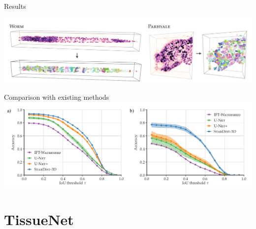 \documentclass[9pt, aspectratio=169]{beamer}
\begin{document}
\begin{frame}
    {Results}
    \centering

    \includegraphics[width=\textwidth]{Weigert2020_results.png}
\end{frame}

\begin{frame}
    {Comparison with existing methods}
    \centering
    \includegraphics[width=\textwidth]{Weigert2020_comparison.png}
\end{frame}

\section{TissueNet}
\end{document}
